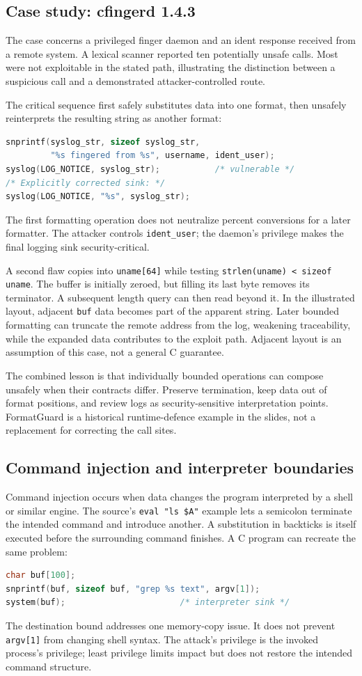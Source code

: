 \documentclass[11pt,a4paper]{article}
\numberwithin{figure}{section}
\begin{document}
\subsection{Case study: cfingerd 1.4.3}
The case concerns a privileged finger daemon and an ident response received from a remote system. A lexical scanner reported ten potentially unsafe calls. Most were not exploitable in the stated path, illustrating the distinction between a suspicious call and a demonstrated attacker-controlled route.

The critical sequence first safely substitutes data into one format, then unsafely reinterprets the resulting string as another format:
\begin{lstlisting}[language=C]
snprintf(syslog_str, sizeof syslog_str,
         "%s fingered from %s", username, ident_user);
syslog(LOG_NOTICE, syslog_str);           /* vulnerable */
/* Explicitly corrected sink: */
syslog(LOG_NOTICE, "%s", syslog_str);
\end{lstlisting}
The first formatting operation does not neutralize percent conversions for a later formatter. The attacker controls \texttt{ident\_user}; the daemon's privilege makes the final logging sink security-critical.

A second flaw copies into \texttt{uname[64]} while testing \texttt{strlen(uname) < sizeof uname}. The buffer is initially zeroed, but filling its last byte removes its terminator. A subsequent length query can then read beyond it. In the illustrated layout, adjacent \texttt{buf} data becomes part of the apparent string. Later bounded formatting can truncate the remote address from the log, weakening traceability, while the expanded data contributes to the exploit path. Adjacent layout is an assumption of this case, not a general C guarantee.

The combined lesson is that individually bounded operations can compose unsafely when their contracts differ. Preserve termination, keep data out of format positions, and review logs as security-sensitive interpretation points. FormatGuard is a historical runtime-defence example in the slides, not a replacement for correcting the call sites.

\subsection{Command injection and interpreter boundaries}
Command injection occurs when data changes the program interpreted by a shell or similar engine. The source's \texttt{eval "ls \$A"} example lets a semicolon terminate the intended command and introduce another. A substitution in backticks is itself executed before the surrounding command finishes. A C program can recreate the same problem:
\begin{lstlisting}[language=C]
char buf[100];
snprintf(buf, sizeof buf, "grep %s text", argv[1]);
system(buf);                       /* interpreter sink */
\end{lstlisting}
The destination bound addresses one memory-copy issue. It does not prevent \texttt{argv[1]} from changing shell syntax. The attack's privilege is the invoked process's privilege; least privilege limits impact but does not restore the intended command structure.
\end{document}
